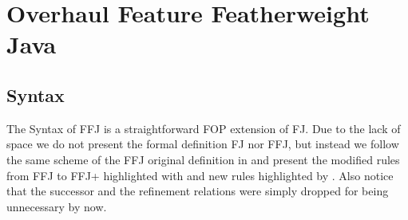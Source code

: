 \chapter{Overhaul Feature Featherweight Java}\label{seq:ffj}

\section{Syntax}
The Syntax of \gls{FFJ} is a straightforward \gls{FOP} extension of \gls{FJ}. Due to the lack
of space we do not present the formal definition \gls{FJ} nor \gls{FFJ}, but instead we follow
the same scheme of the \gls{FFJ} original definition in \cite{apel_feature_2008} and present
the modified rules from \gls{FFJ} to \gls{FFJ+} highlighted with  
and new rules highlighted by . Also notice that the successor and 
the refinement relations were simply dropped for being unnecessary by now.

\newcommand{\cdecl}[6]{\texttt{class #1 extends #2 \{\={#3} \={#4}; #5 \={#6}\}}}
\newcommand{\crefine}[6]{\texttt{refines class #1 \{\={#2} \={#3}; #4 \={#5} \={#6}\}}}
\newcommand{\mdecl}[5]{\texttt{#1 #2 (\={#3} \={#4}) \{return #5;\}}}
\newcommand{\mrefine}[5]{\texttt{refines #1 #2 (\={#3} \={#4}) \{return #5;\}}}

